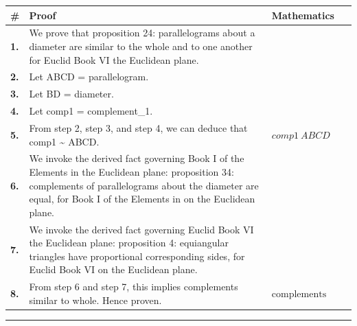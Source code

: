 \documentclass[11pt]{article}
\theoremstyle{definition}
\begin{document}
\begin{tabular}{@{} >{\raggedright\arraybackslash}p{} >{\raggedright\arraybackslash}p{} >{\raggedleft\arraybackslash}p{} @{}}
\textbf{\#} & \textbf{Proof} & \textbf{Mathematics} \\
\midrule
\textbf{1.} & We prove that proposition 24: parallelograms about a diameter are similar to the whole and to one another for Euclid Book VI the Euclidean plane. & \\[0.45em]
\textbf{2.} & Let ABCD = parallelogram. & \\[0.45em]
\textbf{3.} & Let BD = diameter. & \\[0.45em]
\textbf{4.} & Let comp1 = complement\_1. & \\[0.45em]
\textbf{5.} & From step 2, step 3, and step 4, we can deduce that comp1 \textasciitilde{} ABCD. & $\displaystyle comp1 ~ ABCD$ \\[0.45em]
\textbf{6.} & We invoke the derived fact governing Book I of the Elements in the Euclidean plane: proposition 34: complements of parallelograms about the diameter are equal, for Book I of the Elements in on the Euclidean plane. & \\[0.45em]
\textbf{7.} & We invoke the derived fact governing Euclid Book VI the Euclidean plane: proposition 4: equiangular triangles have proportional corresponding sides, for Euclid Book VI on the Euclidean plane. & \\[0.45em]
\textbf{8.} & From step 6 and step 7, this implies complements similar to whole. Hence proven. & $\displaystyle \text{complements similar to whole}$ \\[0.45em]
\bottomrule
\end{tabular}
\label{thm:Geometry-Euclid Book VI-proposition_24_parallelograms_about_a_diameter_are_similar_to_the_whole_and_to_one_another}
\par\medskip\hrule
\end{document}
